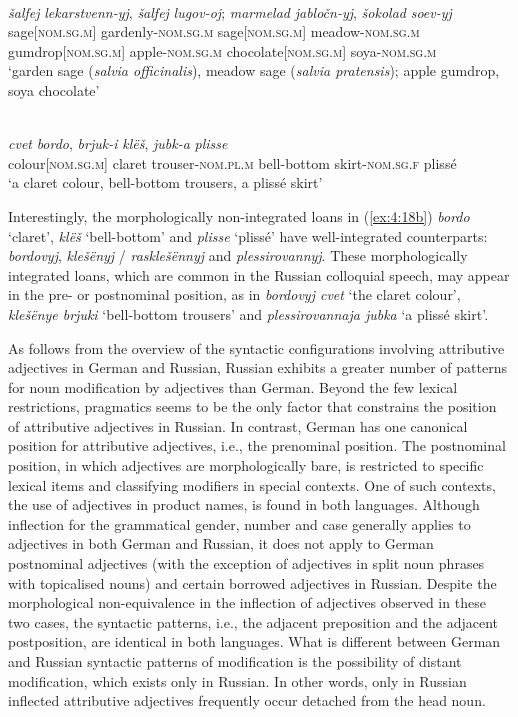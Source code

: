 \ea
\ea{\label{ex:4:18a}}
\citep[203]{rusgramm-tom2}\\
\gll \textit{šalfej} \textit{lekarstvenn-yj}, \textit{šalfej} \textit{lugov-oj}; \textit{marmelad} \textit{jabločn-yj}, \textit{šokolad} \textit{soev-yj}\\
	sage[\textsc{nom.sg.m}] gardenly-\textsc{nom.sg.m} sage[\textsc{nom.sg.m}] meadow-\textsc{nom.sg.m} gumdrop[\textsc{nom.sg.m}] apple-\textsc{nom.sg.m} chocolate[\textsc{nom.sg.m}] soya-\textsc{nom.sg.m}\\
\glt `garden sage (\textit{salvia officinalis}), meadow sage (\textit{salvia pratensis}); apple gumdrop, soya chocolate'

\ex{\label{ex:4:18b}}
\citep[540]{rusgramm-tom1}\\
\gll \textit{cvet} \textit{bordo}, \textit{brjuk-i} \textit{klëš}, \textit{jubk-a} \textit{plisse}\\
	colour[\textsc{nom.sg.m}] claret trouser-\textsc{nom.pl.m} bell-bottom skirt-\textsc{nom.sg.f} plissé\\
\glt `a claret colour, bell-bottom trousers, a plissé skirt'
\z
\z

\noindent Interestingly, the morphologically non-integrated loans in (\ref{ex:4:18b}) \textit{bordo} `claret', \textit{klëš} `bell-bottom' and \textit{plisse} `plissé' have well-integrated counterparts: \textit{bordovyj}, \textit{klešënyj} / \textit{rasklešënnyj} and \textit{plessirovannyj}. These morphologically integrated loans, which are common in the Russian colloquial speech, may appear in the pre- or postnominal position,  as in \textit{bordovyj cvet} `the claret colour', \textit{klešënye brjuki} `bell-bottom trousers' and \textit{plessirovannaja jubka} `a plissé skirt'.

As follows from the overview of the syntactic configurations involving attributive adjectives in German and Russian, Russian exhibits a greater number of patterns for noun modification by adjectives than German. Beyond the few lexical restrictions, pragmatics seems to be the only factor that constrains the position of attributive adjectives in Russian. In contrast, German has one canonical position for attributive adjectives, i.e., the prenominal position. The postnominal position, in which adjectives are morphologically bare, is restricted to specific lexical items and classifying modifiers in special contexts. One of such contexts, the use of adjectives in product names, is found in both languages. Although inflection for the grammatical gender, number and case generally applies to adjectives in both German and Russian, it does not apply to German postnominal adjectives (with the exception of adjectives in split noun phrases with topicalised nouns) and certain borrowed adjectives in Russian. Despite the morphological non-equivalence in the inflection of adjectives observed in these two cases, the syntactic patterns, i.e., the adjacent preposition and the adjacent postposition, are identical in both languages. What is different between German and Russian syntactic patterns of modification is the possibility of distant modification, which exists only in Russian. In other words, only in Russian inflected attributive adjectives frequently occur detached from the head noun.

